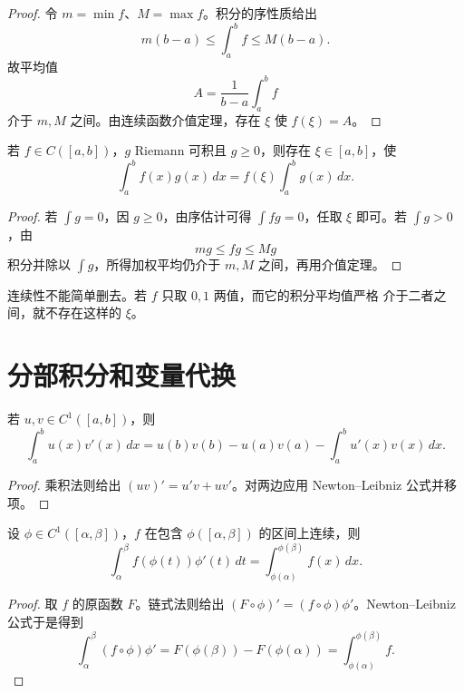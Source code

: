 \begin{proof}
令 \(m=\min f\)、\(M=\max f\)。积分的序性质给出
\[
 m(b-a)\le\int_a^b f\le M(b-a).
\]
故平均值
\[
 A=\frac1{b-a}\int_a^b f
\]
介于 \(m,M\) 之间。由连续函数介值定理，存在 \(\xi\) 使
\(f(\xi)=A\)。
\end{proof}

\begin{theorem}[带权积分中值定理]
\label{thm:weighted-integral-mean-value}
若 \(f\in C([a,b])\)，\(g\) Riemann 可积且 \(g\ge0\)，则存在
\(\xi\in[a,b]\)，使
\[
 \int_a^b f(x)g(x)\,dx
 =f(\xi)\int_a^b g(x)\,dx.
\]
\end{theorem}

\begin{proof}
若 \(\int g=0\)，因 \(g\ge0\)，由序估计可得 \(\int fg=0\)，任取
\(\xi\) 即可。若 \(\int g>0\)，由
\[
 m g\le fg\le M g
\]
积分并除以 \(\int g\)，所得加权平均仍介于 \(m,M\) 之间，再用介值定理。
\end{proof}

连续性不能简单删去。若 \(f\) 只取 \(0,1\) 两值，而它的积分平均值严格
介于二者之间，就不存在这样的 \(\xi\)。

\section{分部积分和变量代换}

\begin{theorem}[分部积分]
\label{thm:riemann-integration-by-parts}
若 \(u,v\in C^1([a,b])\)，则
\[
 \int_a^b u(x)v'(x)\,dx
 =u(b)v(b)-u(a)v(a)-\int_a^b u'(x)v(x)\,dx.
\]
\end{theorem}

\begin{proof}
乘积法则给出
\((uv)'=u'v+uv'\)。对两边应用 Newton--Leibniz 公式并移项。
\end{proof}

\begin{theorem}[变量代换]
\label{thm:riemann-substitution}
设 \(\phi\in C^1([\alpha,\beta])\)，\(f\) 在包含
\(\phi([\alpha,\beta])\) 的区间上连续，则
\[
 \int_\alpha^\beta f(\phi(t))\phi'(t)\,dt
 =\int_{\phi(\alpha)}^{\phi(\beta)}f(x)\,dx.
\]
\end{theorem}

\begin{proof}
取 \(f\) 的原函数 \(F\)。链式法则给出
\((F\circ\phi)'=(f\circ\phi)\phi'\)。Newton--Leibniz 公式于是得到
\[
 \int_\alpha^\beta(f\circ\phi)\phi'
 =F(\phi(\beta))-F(\phi(\alpha))
 =\int_{\phi(\alpha)}^{\phi(\beta)}f.
\]
\end{proof}

